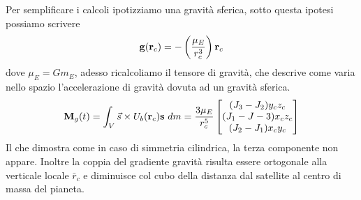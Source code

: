 Per semplificare i calcoli ipotizziamo una gravità sferica, sotto questa ipotesi
possiamo scrivere
\begin{equation}
{\bf g}({\bf r}_c)=-\left(\frac{\mu_E}{r_c^3}\right){\bf r}_c
\end{equation}
dove $\mu_E=Gm_E$, adesso ricalcoliamo il tensore di gravità, che descrive come
varia nello spazio l’accelerazione di gravità dovuta ad un gravità sferica.
\begin{equation}
{\bf M}_g(t)=\int_V\vec{s}\times U_b({\bf r}_c){\bf s} \ dm=\frac{3\mu_E}{r_c^5}
\begin{bmatrix}
(J_3-J_2)y_cz_c \\ (J_1-J-3)x_cz_c \\ (J_2-J_1)x_cy_c
\end{bmatrix}
\end{equation}
Il che dimostra come in caso di simmetria cilindrica, la terza componente non
appare. Inoltre la coppia del gradiente gravità risulta essere ortogonale alla
verticale locale $\bar{r}_c$ e diminuisce col cubo della distanza dal satellite
al centro di massa del pianeta.

